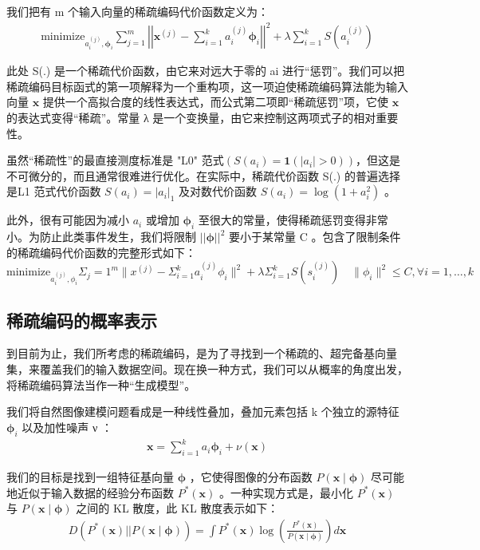 我们把有 m 个输入向量的稀疏编码代价函数定义为：
\begin{align}
\text{minimize}_{a^{(j)}_i,\mathbf{\phi}_{i}} \sum_{j=1}^{m} \left|\left| \mathbf{x}^{(j)} - \sum_{i=1}^k a^{(j)}_i \mathbf{\phi}_{i}\right|\right|^{2} + \lambda \sum_{i=1}^{k}S(a^{(j)}_i)
\end{align}

此处 S(.) 是一个稀疏代价函数，由它来对远大于零的 ai 进行“惩罚”。我们可以把稀疏编码目标函式的第一项解释为一个重构项，这一项迫使稀疏编码算法能为输入向量 $\mathbf{x}$ 提供一个高拟合度的线性表达式，而公式第二项即“稀疏惩罚”项，它使 $\mathbf{x}$ 的表达式变得“稀疏”。常量 λ 是一个变换量，由它来控制这两项式子的相对重要性。

虽然“稀疏性”的最直接测度标准是 "L0" 范式$(S(a_i) = \mathbf{1}(|a_i|>0))$，但这是不可微分的，而且通常很难进行优化。在实际中，稀疏代价函数 S(.) 的普遍选择是L1 范式代价函数 $S(a_i)=\left|a_i\right|_1$  及对数代价函数 $S(a_i)=\log(1+a_i^2)$ 。

此外，很有可能因为减小 $a_i$ 或增加 $\mathbf{\phi}_i$ 至很大的常量，使得稀疏惩罚变得非常小。为防止此类事件发生，我们将限制 $\left|\left|\mathbf{\phi}\right|\right|^2$ 要小于某常量 C 。包含了限制条件的稀疏编码代价函数的完整形式如下：
\begin{equation}
\text{minimize}_{a_i^{(j)},\phi_i}\Sigma_j=1^m\|x^{(j)}-\Sigma_{i=1}^ka_i^{(j)}\phi_i\|^2+\lambda\Sigma_{i=1}^kS(s_i^{(j)})\quad\|\phi_i\|^2\leq C,\forall i=1,\ldots,k
\end{equation}
\subsection{稀疏编码的概率表示}
到目前为止，我们所考虑的稀疏编码，是为了寻找到一个稀疏的、超完备基向量集，来覆盖我们的输入数据空间。现在换一种方式，我们可以从概率的角度出发，将稀疏编码算法当作一种“生成模型”。

我们将自然图像建模问题看成是一种线性叠加，叠加元素包括 k 个独立的源特征 $\mathbf{\phi}_i$ 以及加性噪声 ν ：
\begin{align}
\mathbf{x} = \sum_{i=1}^k a_i \mathbf{\phi}_{i} + \nu(\mathbf{x})
\end{align}

我们的目标是找到一组特征基向量 $\mathbf{\phi}$ ，它使得图像的分布函数 $P(\mathbf{x}\mid\mathbf{\phi})$ 尽可能地近似于输入数据的经验分布函数 $P^*(\mathbf{x})$ 。一种实现方式是，最小化 $P^*(\mathbf{x})$ 与 $P(\mathbf{x}\mid\mathbf{\phi})$ 之间的 KL 散度，此 KL 散度表示如下：
\begin{align}
D(P^*(\mathbf{x})||P(\mathbf{x}\mid\mathbf{\phi})) = \int P^*(\mathbf{x}) \log \left(\frac{P^*(\mathbf{x})}{P(\mathbf{x}\mid\mathbf{\phi})}\right)d\mathbf{x}
\end{align}

